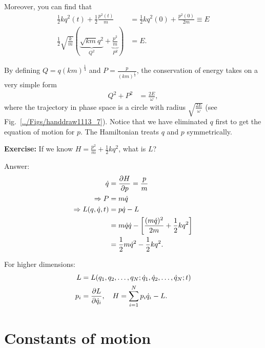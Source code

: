 
Moreover, you can find that
\begin{align}
\frac{1}{2} k q^2(t) + \frac{1}{2} \frac{p^2(t)}{m} &= \frac{1}{2} kq^2(0) + \frac{p^2(0)}{2m} \equiv E\\
\frac{1}{2} \sqrt{\frac{k}{m}} \left( \underbrace{\sqrt{km} q^2}_{Q^2} + \underbrace{\frac{p^2}{m}}_{P^2} \right) &=E.
\end{align}

By defining $Q=q(km)^{\frac{1}{4}}$ and $P=\frac{p}{(km)^{\frac{1}{4}}}$,
the conservation of energy takes on a very simple form
\begin{align}
Q^{2}+P^{2} & =\frac{2E}{\omega},
\end{align}
where the trajectory in phase space is a circle with radius $\sqrt{\frac{2E}{\omega}}$ (see Fig.~\ref{../Figs/handdraw1113_7}).
Notice that we have eliminated $q$ first to get the equation of motion
for $p$. The Hamiltonian treats $q$ and $p$ symmetrically.

\textbf{Exercise:}
If we know $ H=\frac{p^2}{m} + \frac{1}{2}kq^2 $, what is $ L $? 

Answer: \begin{align}
\dot{q} &= \frac{\partial {H}}{\partial {p}}=\frac{p}{m}\\
\Rightarrow P &= m\dot{q}\\
\Rightarrow L(q,\dot{q},t) &= p\dot{q} -L\\
&= m\dot{q}\dot{q} - \left[\frac{(m\dot{q})^2}{2m} + \frac{1}{2}kq^2 \right]\\
&= \frac{1}{2} m\dot{q}^2 - \frac{1}{2}kq^2.
\end{align}

For higher dimensions:
\begin{align}
L &= L(q_1,q_2,\ldots,q_N;\dot{q}_1,\dot{q}_2,\ldots,\dot{q}_N;t)\\
p_i &= \frac{\partial {L}}{\partial {\dot{q}_i}}, \quad  H=\sum_{i=1}^{N}p_i\dot{q}_i-L.
\end{align}


\section{Constants of motion}

